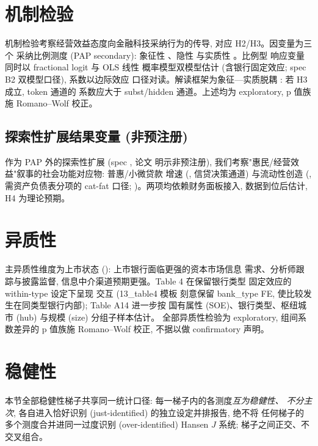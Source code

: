 \section{机制检验}\label{sec:mech}
机制检验考察经营效益态度向金融科技采纳行为的传导, 对应 H2/H3。因变量为三个
采纳比例测度 (PAP secondary): 象征性 、隐性
 与实质性 。比例型
响应变量同时以 fractional logit \parencite{papke1996fractional} 与 OLS 线性
概率模型双模型估计 (含银行固定效应; spec B2 双模型口径), 系数以边际效应
口径对读。解读框架为象征—实质脱耦
\parencite{westphal1994substance,fiss2006symbolic}: 若 H3 成立, token 通道的
系数应大于 subst/hidden 通道。上述均为 exploratory, p 值族施 Romano--Wolf
校正。

\subsection{探索性扩展结果变量 (非预注册)}\label{sec:mech:ext}
作为 PAP 外的探索性扩展 (spec , 论文
明示非预注册), 我们考察"惠民/经营效益"叙事的社会功能对应物: 普惠/小微贷款
增速 (, 信贷决策通道) 与流动性创造
(, 需资产负债表分项的 cat-fat 口径;
)。两项均依赖财务面板接入, 数据到位后估计,
H4 为理论预期。

\section{异质性}\label{sec:het}
主异质性维度为上市状态 (): 上市银行面临更强的资本市场信息
需求、分析师跟踪与披露监督, 信息中介渠道预期更强。Table 4 在保留银行类型
固定效应的 within-type 设定下呈现  交互 (13\_table4 模板
刻意保留 bank\_type FE, 使比较发生在同类型银行内部); Table A14 进一步按
国有属性 (SOE)、银行类型、枢纽城市 (hub) 与规模 (size) 分组子样本估计。
全部异质性检验为 exploratory, 组间系数差异的 p 值族施 Romano--Wolf 校正,
不据以做 confirmatory 声明。

\section{稳健性}\label{sec:robust}
本节全部稳健性梯子共享同一统计口径: 每一梯子内的各测度\emph{互为稳健性、
不分主次}, 各自进入恰好识别 (just-identified) 的独立设定并排报告, 绝不将
任何梯子的多个测度合并进同一过度识别 (over-identified) Hansen $J$ 系统;
梯子之间正交、不交叉组合。

